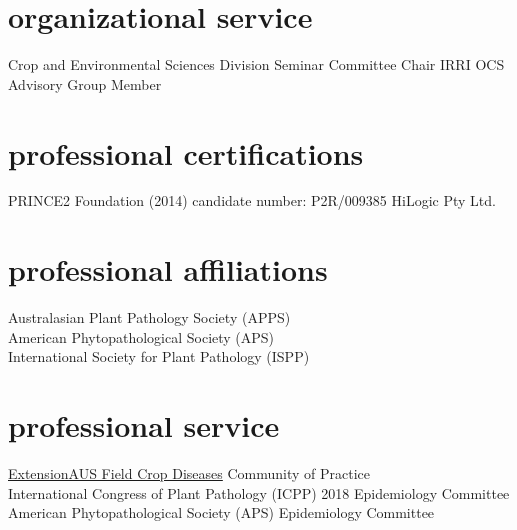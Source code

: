       \section*{organizational service}
        \begin{entrylist}
        		{Crop and Environmental Sciences Division Seminar Committee Chair}
        		{}
        		{}
        	{IRRI OCS Advisory Group Member}
        	{}
        	{}
        \end{entrylist}
        \section*{professional certifications}
        PRINCE2 Foundation (2014) candidate number: P2R/009385  HiLogic Pty Ltd.

        \section*{professional affiliations}
        Australasian Plant Pathology Society (APPS)\\
        American Phytopathological Society (APS)\\
        International Society for Plant Pathology (ISPP)\\

        \section*{professional service}
        \href{http://extensionaus.com.au/field-crop-diseases/}{ExtensionAUS Field Crop Diseases} Community of Practice\\
        International Congress of Plant Pathology (ICPP) 2018 Epidemiology Committee\\
        American Phytopathological Society (APS) Epidemiology Committee\\
